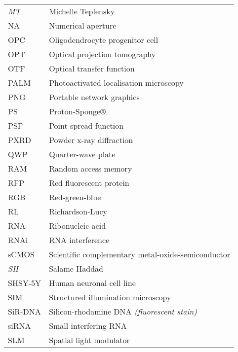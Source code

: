 \begin{flushleft}
\begin{longtable}[l]{|p{5.5em}|p{25em}|}
\textit{MT} & Michelle Teplensky                                        \\
NA         & Numerical aperture                                         \\
OPC        & Oligodendrocyte progenitor cell                            \\
OPT        & Optical projection tomography                              \\
OTF        & Optical transfer function                                  \\
PALM       & Photoactivated localisation microscopy                     \\
PNG        & Portable network graphics                                  \\
PS		   & Proton-Sponge®												\\
PSF        & Point spread function                                      \\
PXRD       & Powder x-ray diffraction                                   \\
QWP        & Quarter-wave plate                                         \\
RAM 	   & Random access memory										\\
RFP        & Red fluorescent protein                                    \\
RGB        & Red-green-blue                                             \\
RL         & Richardson-Lucy                                            \\
RNA        & Ribonucleic acid                                           \\
RNAi       & RNA interference                                           \\
sCMOS      & Scientific complementary metal-oxide-semiconductor         \\
\textit{SH} & Salame Haddad                                             \\
SHSY-5Y	   & Human neuronal cell line								    \\
SIM        & Structured illumination microscopy                         \\
SiR-DNA    & Silicon-rhodamine DNA \textit{(fluorescent stain)}         \\
siRNA      & Small interfering RNA                                      \\
SLM        & Spatial light modulator                                    \\

\end{longtable}
\end{flushleft}
